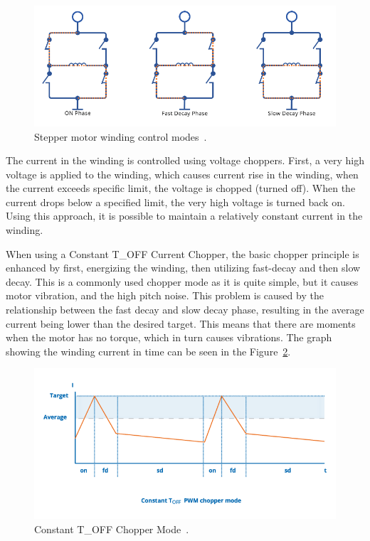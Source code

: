 \begin{figure}[H]
    \centering
    \includegraphics[width=\textwidth]{obrazky/winding_modes}
    \caption{Stepper motor winding control modes~\cite{trinamic_chopper_nodate}.}
    \label{fig:current_phases}
\end{figure}

The current in the winding is controlled using voltage choppers.
First, a very high voltage is applied to the winding, which causes current rise in the winding, when the current exceeds specific limit, the voltage is chopped (turned off).
When the current drops below a specified limit, the very high voltage is turned back on.
Using this approach, it is possible to maintain a relatively constant current in the winding\cite{trinamic_chopper_nodate}.

When using a Constant T\_OFF Current Chopper, the basic chopper principle is enhanced by first, energizing the winding, then utilizing fast-decay and then slow decay.
This is a commonly used chopper mode as it is quite simple, but it causes motor vibration, and the high pitch noise.
This problem is caused by the relationship between the fast decay and slow decay phase, resulting in the average current being lower than the desired target.
This means that there are moments when the motor has no torque, which in turn causes vibrations\cite{trinamic_chopper_nodate}.
The graph showing the winding current in time can be seen in the Figure~\ref{fig:t_off_chopper}.

\begin{figure}[H]
    \centering
    \includegraphics[width=\textwidth]{obrazky/t_off_chopper}
    \caption{Constant T\_OFF Chopper Mode~\cite{trinamic_chopper_nodate}.}
    \label{fig:t_off_chopper}
\end{figure}

